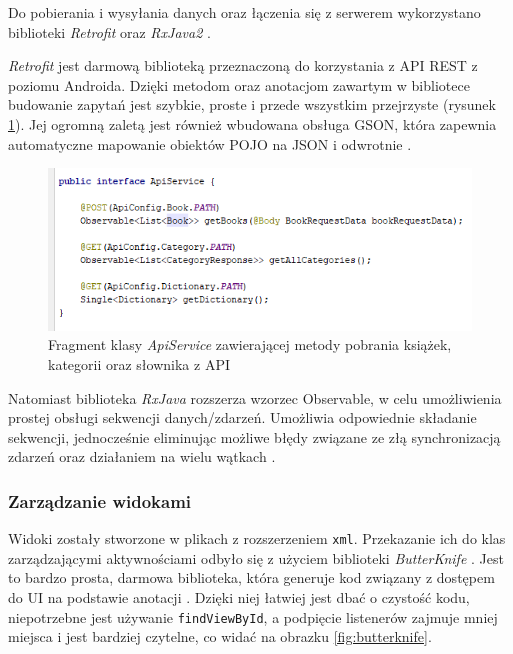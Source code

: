 \documentclass[twoside]{projektInzynierskiMS}
\begin{document}
Do pobierania i wysyłania danych oraz łączenia się z serwerem wykorzystano biblioteki \textit{Retrofit} \cite{retrofit} oraz \textit{RxJava2} \cite{rxjava2}.

\textit{Retrofit} jest darmową biblioteką przeznaczoną do korzystania z API REST z poziomu Androida. Dzięki metodom oraz anotacjom zawartym w bibliotece budowanie zapytań jest szybkie, proste i przede wszystkim przejrzyste (rysunek \ref{fig:retrofit}). Jej ogromną zaletą jest również wbudowana obsługa GSON, która zapewnia automatyczne mapowanie obiektów POJO na JSON i odwrotnie \cite{PPPAndroida}.

\begin{figure}[h]
  \centering
  \includegraphics[width=0.8\linewidth]{img/android/apiService.png}
  \caption{Fragment klasy \textit{ApiService} zawierającej metody pobrania książek, kategorii oraz słownika z API}
  \label{fig:retrofit}
\end{figure}

Natomiast biblioteka \textit{RxJava} rozszerza wzorzec Observable, w celu umożliwienia prostej obsługi sekwencji danych/zdarzeń. Umożliwia odpowiednie składanie sekwencji, jednocześnie eliminując możliwe błędy związane ze złą synchronizacją zdarzeń oraz działaniem na wielu wątkach \cite{rxjava2}.

\subsubsection{Zarządzanie widokami}

Widoki zostały stworzone w plikach z rozszerzeniem \verb`xml`. Przekazanie ich do klas zarządzającymi aktywnościami odbyło się z użyciem biblioteki \textit{ButterKnife} \cite{butterknife}. Jest to bardzo prosta, darmowa biblioteka, która generuje kod związany z dostępem do UI na podstawie anotacji \cite{PPPAndroida}. Dzięki niej łatwiej jest dbać o czystość kodu, niepotrzebne jest używanie \verb`findViewById`, a podpięcie listenerów zajmuje mniej miejsca i jest bardziej czytelne, co widać na obrazku \ref{fig:butterknife}.
\end{document}
